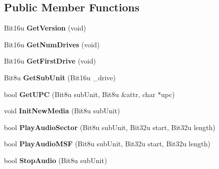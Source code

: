 \subsection*{Public Member Functions}
\begin{DoxyCompactItemize}
\item 
\hypertarget{classCMscdex_aa0171ef3598f6247cbab681650f27c1a}{Bit16u {\bfseries Get\-Version} (void)}\label{classCMscdex_aa0171ef3598f6247cbab681650f27c1a}

\item 
\hypertarget{classCMscdex_a5a5347a5f62cc476ce4660bffa9c59ed}{Bit16u {\bfseries Get\-Num\-Drives} (void)}\label{classCMscdex_a5a5347a5f62cc476ce4660bffa9c59ed}

\item 
\hypertarget{classCMscdex_a83c6d7ce25d9c4453c42af88cd090566}{Bit16u {\bfseries Get\-First\-Drive} (void)}\label{classCMscdex_a83c6d7ce25d9c4453c42af88cd090566}

\item 
\hypertarget{classCMscdex_af464d504ec1b87e3bebe1a5881288b03}{Bit8u {\bfseries Get\-Sub\-Unit} (Bit16u \-\_\-drive)}\label{classCMscdex_af464d504ec1b87e3bebe1a5881288b03}

\item 
\hypertarget{classCMscdex_a935f2827a5e6483af5cde6aed832fef2}{bool {\bfseries Get\-U\-P\-C} (Bit8u sub\-Unit, Bit8u \&attr, char $\ast$upc)}\label{classCMscdex_a935f2827a5e6483af5cde6aed832fef2}

\item 
\hypertarget{classCMscdex_a912da85172868635b5054b03504f24ce}{void {\bfseries Init\-New\-Media} (Bit8u sub\-Unit)}\label{classCMscdex_a912da85172868635b5054b03504f24ce}

\item 
\hypertarget{classCMscdex_ab6c3f7cbef5c49d50bcf3888aadd8406}{bool {\bfseries Play\-Audio\-Sector} (Bit8u sub\-Unit, Bit32u start, Bit32u length)}\label{classCMscdex_ab6c3f7cbef5c49d50bcf3888aadd8406}

\item 
\hypertarget{classCMscdex_ac38f29f8c5bad65c549b6e61e40a0f61}{bool {\bfseries Play\-Audio\-M\-S\-F} (Bit8u sub\-Unit, Bit32u start, Bit32u length)}\label{classCMscdex_ac38f29f8c5bad65c549b6e61e40a0f61}

\item 
\hypertarget{classCMscdex_ad0afd07bd4b3f61fec5dd7ff51fb1b01}{bool {\bfseries Stop\-Audio} (Bit8u sub\-Unit)}\label{classCMscdex_ad0afd07bd4b3f61fec5dd7ff51fb1b01}


\end{DoxyCompactItemize}
